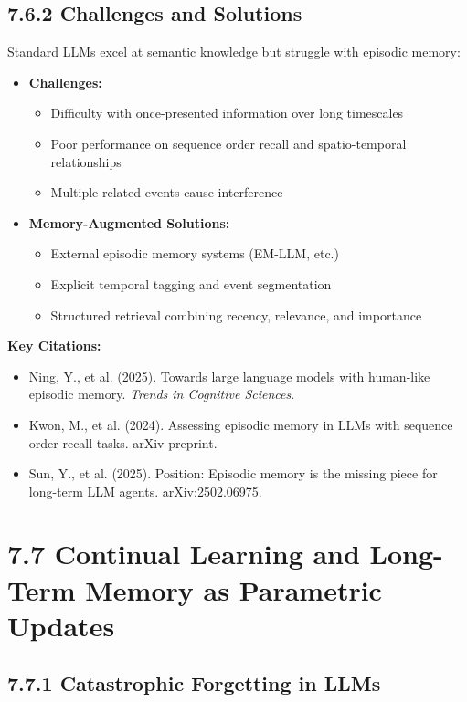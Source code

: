 \documentclass[11pt,letterpaper]{article}
\begin{document}
\subsection{7.6.2 Challenges and Solutions}

Standard LLMs excel at semantic knowledge but struggle with episodic memory:

\begin{itemize}[leftmargin=*]
    \item \textbf{Challenges:}
    \begin{itemize}
        \item Difficulty with once-presented information over long timescales
        \item Poor performance on sequence order recall and spatio-temporal relationships
        \item Multiple related events cause interference
    \end{itemize}
    \item \textbf{Memory-Augmented Solutions:}
    \begin{itemize}
        \item External episodic memory systems (EM-LLM, etc.)
        \item Explicit temporal tagging and event segmentation
        \item Structured retrieval combining recency, relevance, and importance
    \end{itemize}
\end{itemize}

\textbf{Key Citations:}
\begin{itemize}[leftmargin=*]
    \item Ning, Y., et al. (2025). Towards large language models with human-like episodic memory. \textit{Trends in Cognitive Sciences}.
    \item Kwon, M., et al. (2024). Assessing episodic memory in LLMs with sequence order recall tasks. arXiv preprint.
    \item Sun, Y., et al. (2025). Position: Episodic memory is the missing piece for long-term LLM agents. arXiv:2502.06975.
\end{itemize}

\section{\color{garnet}7.7 Continual Learning and Long-Term Memory as Parametric Updates}

\subsection{7.7.1 Catastrophic Forgetting in LLMs}
\end{document}
